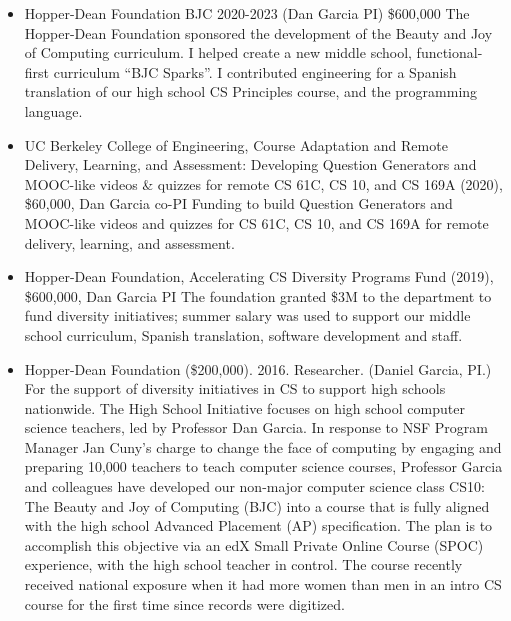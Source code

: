 \begin{itemize}
    \item{Hopper-Dean Foundation BJC 2020-2023 (Dan Garcia PI) \$600,000
    \newline
    The Hopper-Dean Foundation sponsored the development of the Beauty and Joy of Computing curriculum. I helped create a new middle school, functional-first curriculum ``BJC Sparks''. I contributed engineering for a Spanish translation of our high school CS Principles course, and the \snap programming language.}

    \item{UC Berkeley College of Engineering, Course Adaptation and Remote Delivery, Learning, and Assessment: Developing Question Generators and MOOC-like videos \& quizzes for remote CS 61C, CS 10, and CS 169A (2020), \$60,000, Dan Garcia co-PI
    \newline
    Funding to build Question Generators and MOOC-like videos and quizzes for CS 61C, CS 10, and CS 169A for remote delivery, learning, and assessment.
    }
    
    \item{Hopper-Dean Foundation, Accelerating CS Diversity Programs Fund (2019), \$600,000, Dan Garcia PI
    \newline
    The foundation granted \$3M to the department to fund diversity initiatives; summer salary was used to support our middle school curriculum, Spanish translation, software development and staff.
    }

    \item{Hopper-Dean Foundation (\$200,000). 2016. Researcher. (Daniel Garcia, PI.)}
    \newline\small{For the support of diversity initiatives in CS to support high schools nationwide. The High School Initiative focuses on high school computer science teachers, led by Professor Dan Garcia. In response to NSF Program Manager Jan Cuny's charge to change the face of computing by engaging and preparing 10,000 teachers to teach computer science courses, Professor Garcia and colleagues have developed our non-major computer science class CS10: The Beauty and Joy of Computing (BJC) into a course that is fully aligned with the high school Advanced Placement (AP) specification. The plan is to accomplish this objective via an edX Small Private Online Course (SPOC) experience, with the high school teacher in control. The course recently received national exposure when it had more women than men in an intro CS course for the first time since records were digitized.}


\end{itemize}
